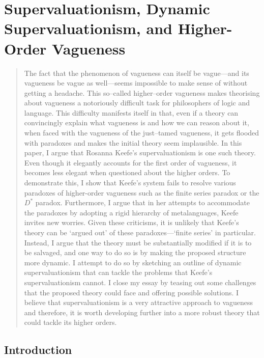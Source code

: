 \chapter{Supervaluationism, Dynamic Supervaluationism, and Higher-Order Vagueness}
\renewcommand*{\thesection}{\arabic{section}.}
\renewcommand*{\thesubsection}{\arabic{section}.\arabic{subsection}.}

\begin{quote}
The fact that the phenomenon of vagueness can itself be vague---and 
its vagueness be vague as well---seems impossible to make sense of
without getting a headache. This so--called higher--order vagueness makes
theorising about vagueness a notoriously difficult task for philosophers
of logic and language. This difficulty manifests itself in that, even if
a theory can convincingly explain what vagueness is and how we can
reason about it, when faced with the vagueness of the just--tamed
vagueness, it gets flooded with paradoxes and makes the initial theory
seem implausible. In this paper, I argue that Rosanna Keefe's
supervaluationism is one such theory. Even though it elegantly accounts
for the first order of vagueness, it becomes less elegant when
questioned about the higher orders. To demonstrate this, I show that
Keefe's system fails to resolve various paradoxes of higher-order
vagueness such as the finite series paradox or the $D^*$ paradox.
Furthermore, I argue that in her attempts to accommodate the paradoxes
by adopting a rigid hierarchy of metalanguages, Keefe invites new
worries. Given these criticisms, it is unlikely that Keefe's theory can
be `argued out' of these paradoxes---`finite series' in particular.
Instead, I argue that the theory must be substantially modified if it is
to be salvaged, and one way to do so is by making the proposed structure
more dynamic. I attempt to do so by sketching an outline of dynamic
supervaluationism that can tackle the problems that Keefe's
supervaluationism cannot. I close my essay by teasing out some
challenges that the proposed theory could face and offering possible
solutions. I believe that supervaluationism is a very attractive
approach to vagueness and therefore, it is worth developing further into
a more robust theory that could tackle its higher orders.
\end{quote}

\section{Introduction}

